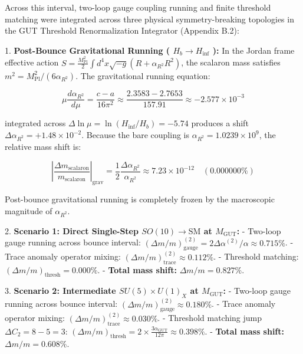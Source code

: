 \documentclass[11pt,a4paper]{article}
\theoremstyle{definition}\newtheorem{definition}{Definition}
\theoremstyle{remark}\newtheorem{remark}{Remark}
\begin{document}
Across this interval, two-loop gauge coupling running and finite threshold matching were integrated across three physical symmetry-breaking topologies in the GUT Threshold Renormalization Integrator (Appendix B.2):

1. \textbf{Post-Bounce Gravitational Running ( $H_b \to H_{\text{inf}}$ ):}
In the Jordan frame effective action $S = \frac{M_{\text{Pl}}^2}{2}\int d^4x\sqrt{-g}(R + \alpha_{R^2} R^2)$, the scalaron mass satisfies $m^2 = M_{\text{Pl}}^2 / (6\alpha_{R^2})$. The gravitational running equation:


\begin{equation}
\mu \frac{d\alpha_{R^2}}{d\mu} = \frac{c - a}{16\pi^2} \approx \frac{2.3583 - 2.7653}{157.91} \approx -2.577 \times 10^{-3}
\end{equation}


integrated across $\Delta\ln\mu = \ln(H_{\text{inf}}/H_b) = -5.74$ produces a shift $\Delta\alpha_{R^2} = +1.48 \times 10^{-2}$. Because the bare coupling is $\alpha_{R^2} = 1.0239 \times 10^9$, the relative mass shift is:


\begin{equation}
\left|\frac{\Delta m_{\text{scalaron}}}{m_{\text{scalaron}}}\right|_{\text{grav}} = \frac{1}{2} \frac{\Delta\alpha_{R^2}}{\alpha_{R^2}} \approx 7.23 \times 10^{-12} \quad (\mathbf{0.000000\%})
\end{equation}


Post-bounce gravitational running is completely frozen by the macroscopic magnitude of $\alpha_{R^2}$.

2. \textbf{Scenario 1: Direct Single-Step $SO(10) \to \text{SM}$ at $M_{\text{GUT}}$:}
- Two-loop gauge running across bounce interval: $(\Delta m/m)_{\text{gauge}}^{(2)} = 2 \Delta\alpha^{(2)}/\alpha \approx 0.715\%$.
- Trace anomaly operator mixing: $(\Delta m/m)_{\text{trace}}^{(2)} \approx 0.112\%$.
- Threshold matching: $(\Delta m/m)_{\text{thresh}} = 0.000\%$.
- \textbf{Total mass shift:} $\Delta m / m = 0.827\%$.

3. \textbf{Scenario 2: Intermediate $SU(5) \times U(1)_X$ at $M_{\text{GUT}}$:}
- Two-loop gauge running across bounce interval: $(\Delta m/m)_{\text{gauge}}^{(2)} \approx 0.180\%$.
- Trace anomaly operator mixing: $(\Delta m/m)_{\text{trace}}^{(2)} \approx 0.030\%$.
- Threshold matching jump $\Delta C_2 = 8 - 5 = 3$: $(\Delta m/m)_{\text{thresh}} = 2 \times \frac{3 \alpha_{\text{GUT}}}{12\pi} \approx 0.398\%$.
- \textbf{Total mass shift:} $\Delta m / m = 0.608\%$.
\end{document}
